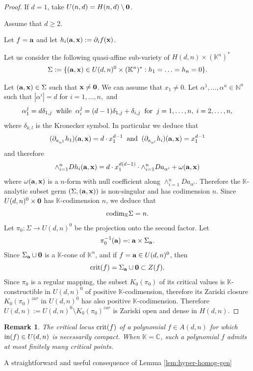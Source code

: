 \documentclass[11pt]{amsart}
\newtheorem{remark}[theorem]{Remark}
\newcommand{\field}[1]{\mathbb{#1}}
\newcommand{\C}{\field{C}}
\newcommand{\K}{\field{K}}
\newcommand{\N}{\field{N}}
\newcommand{\aph}{{\alpha}}
\newcommand{\ba}{{\bf a}}
\newcommand{\bbo}{{\bf 0}}
\newcommand{\bx}{{\bf x}}
\newcommand{\crit}{{\rm crit}}
\newcommand{\dd}{{\partial}}
\newcommand{\dlt}{{\delta}}
\newcommand{\ini}{{\rm in}}
\newcommand{\Kn}{{\K^n}}
\newcommand{\omg}{\omega}
\newcommand{\Sgm}{\Sigma}
\numberwithin{equation}{section}
\numberwithin{equation}{section}
\begin{document}
\begin{proof}
If $d = 1$, take $U(n,d) = H(n,d)\setminus \bbo$.

\medskip
Assume that $d\geq 2$.

Let $f = \ba$ and let $h_i(\ba,\bx) := \dd_i f (\bx)$.

Let us consider the following quasi-affine sub-variety of 
$H(d,n) \times (\Kn)^*$
$$
\Sgm := \{(\ba,\bx) \in U(d,n)^0 \times (\K^n)^* : h_1 = \ldots = h_n = 0\}.
$$

Let $(\ba,\bx) \in \Sgm$ such that $\bx \neq \bbo$. We can assume that $x_1
\neq 0$. Let $\aph^1,\ldots,\aph^n \in \N^n$ such that $|\aph^i| = d$ for 
$i=1,\ldots,n,$ and
$$
\aph_1^j = d\dlt_{1,j} \;\; {\rm while} \;\; 
\aph_i^j = (d-1)\dlt_{1,j} + \dlt_{i,j} \;\; {\rm for} \;\; j=1,\ldots,n,
\; i= 2,\ldots,n,
$$
where $\dlt_{k,l}$ is the Kronecker symbol. In particular we deduce
that 
$$
(\dd_{a_{\aph^1}} h_1) (\ba,\bx) = d \cdot x_1^{d-1} \;\; {\rm and} \;\; 
(\dd_{a_{\aph^i}} h_i) (\ba,\bx) = x_1^{d-1}
$$
and therefore 
$$
\wedge_{i=1}^n Dh_i (\ba,\bx) = d \cdot x_1^{d(d-1)} \cdot \wedge_{i=1}^n 
Da_{\aph^i} + \omg(\ba,\bx)
$$
where $\omg(\ba,\bx)$ is a $n$-form with null coefficient along 
$\wedge_{i=1}^n Da_{\aph^i}$. Therefore the $\K$-analytic subset 
germ $(\Sgm,(\ba,\bx))$ is non-singular and has codimension $n$.
Since $U(d,n)^0\times\bbo$ has $\K$-codimension $n$, we deduce 
that 
$$
{\rm codim}_\K \Sgm = n.
$$
Let $\pi_0 : \Sgm \to U(d,n)^0$ be the projection onto the second factor. 
Let 
$$
\pi_0^{-1}(\ba) =: \ba \times \Sgm_\ba. 
$$
Since $\Sgm_\ba \cup \bbo$ is a $\K$-cone of $\K^n$, and if $f =\ba \in 
U(d,n)^0$, then
$$
\crit(f) = \Sgm_\ba \cup \bbo \subset Z(f).
$$
Since $\pi_0$ is a regular mapping, the subset $K_0(\pi_0)$ of its critical 
values is $\K$-constructible in $U(d,n)^0$ of positive $\K$-codimension,
therefore its Zariski closure $K_0(\pi_0)^{zar}$ in $U(d,n)^0$ has also 
positive $\K$-codimension. Therefore $U(d,n) := U(d,n)^0 \setminus 
K_0(\pi_0)^{zar}$ is Zariski open and dense in $H(d,n)$.
\end{proof}
%
%
\begin{remark}\label{rmk:hyper-homog-gen}
The critical locus $\crit(f)$ of a polynomial $f \in A(d,n)$ for which 
$\ini(f) \in U(d,n)$ is necessarily compact. When $\K=\C$, such a 
polynomial $f$ admits at most finitely many critical points.
\end{remark}
%
%
A straightforward and useful consequence of Lemma \ref{lem:hyper-homog-gen} 
\end{document}
